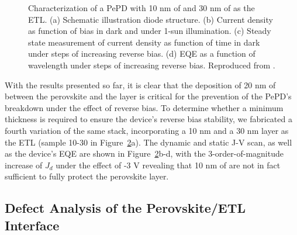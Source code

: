 \begin{figure}[t]
\begin{subfigure}[t]{0.4\textwidth}
        \caption{}
        \label{}
    \end{subfigure}
    \caption[Overview of electrical characterization results for PePDs with 10 nm of  and 30 nm of  as the ETL.]{Characterization of a PePD with 10 nm of  and 30 nm of  as the ETL. (a) Schematic illustration diode structure. (b) Current density as function of bias in dark and under 1-sun illumination. (c) Steady state measurement of current density as function of time in dark under steps of increasing reverse bias. (d) EQE as a function of wavelength under steps of increasing reverse bias. Reproduced from \cite{Papadopoulou2025ElectronSpeed}.}
    \label{fig:etl_opt:10nmC60_30nmTiO2}
\end{figure}



With the results presented so far, it is clear that the deposition of 20 nm of  between the perovskite and the  layer is critical for the prevention of the PePD's breakdown under the effect of reverse bias. To determine whether a minimum  thickness is required to ensure the device's reverse bias stability, we fabricated a fourth variation of the same stack, incorporating a 10 nm  and a 30 nm  layer as the ETL (sample 10-30 in Figure~\ref{fig:etl_opt:10nmC60_30nmTiO2}a). The dynamic and static J-V scan, as well as the device's EQE are shown in Figure~\ref{fig:etl_opt:10nmC60_30nmTiO2}b-d, with the 3-order-of-magnitude increase of $J_d$ under the effect of -3 V revealing that 10 nm of  are not in fact sufficient to fully protect the perovskite layer.




\subsection{Defect Analysis of the Perovskite/ETL Interface}



